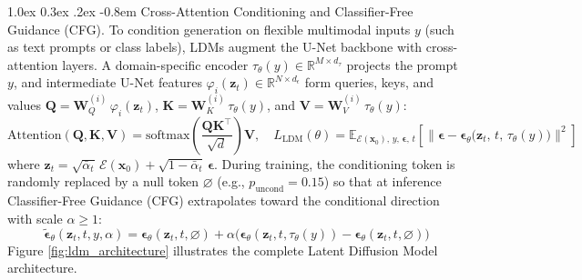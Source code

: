 \documentclass[10pt,a4paper]{article}
\makeatletter
\renewcommand\paragraph{\@startsection{paragraph}{4}{\z@}%
                                    {1.0ex \@plus 0.3ex \@minus .2ex}%
                                    {-0.8em}%
                                    {\normalfont\normalsize\bfseries}}
\makeatother
\begin{document}
\paragraph{Cross-Attention Conditioning and Classifier-Free Guidance (CFG).}
To condition generation on flexible multimodal inputs $y$ (such as text prompts or class labels), LDMs augment the U-Net backbone with cross-attention layers. A domain-specific encoder $\tau_\theta(y) \in \mathbb{R}^{M \times d_\tau}$ projects the prompt $y$, and intermediate U-Net features $\varphi_i(\mathbf{z}_t) \in \mathbb{R}^{N \times d_\epsilon}$ form queries, keys, and values $\mathbf{Q} = \mathbf{W}_Q^{(i)}\,\varphi_i(\mathbf{z}_t)$, $\mathbf{K} = \mathbf{W}_K^{(i)}\,\tau_\theta(y)$, and $\mathbf{V} = \mathbf{W}_V^{(i)}\,\tau_\theta(y)$:
\begin{equation}
    \text{Attention}(\mathbf{Q}, \mathbf{K}, \mathbf{V}) = \text{softmax}\!\left(\frac{\mathbf{Q}\mathbf{K}^\top}{\sqrt{d}}\right)\mathbf{V}, \quad L_{\text{LDM}}(\theta) = \mathbb{E}_{\mathcal{E}(\mathbf{x}_0), \, y, \, \bm{\epsilon}, \, t}\left[\big\|\bm{\epsilon} - \bm{\epsilon}_\theta\big(\mathbf{z}_t, \, t, \, \tau_\theta(y)\big)\big\|^2\right]
    \label{eq:l_ldm}
\end{equation}
where $\mathbf{z}_t = \sqrt{\bar{\alpha}_t}\,\mathcal{E}(\mathbf{x}_0) + \sqrt{1 - \bar{\alpha}_t}\,\bm{\epsilon}$. During training, the conditioning token is randomly replaced by a null token $\varnothing$ (e.g., $p_{\text{uncond}} = 0.15$) so that at inference Classifier-Free Guidance (CFG) extrapolates toward the conditional direction with scale $\alpha \ge 1$:
\begin{equation}
    \tilde{\bm{\epsilon}}_\theta(\mathbf{z}_t, t, y, \alpha) = \bm{\epsilon}_\theta(\mathbf{z}_t, t, \varnothing) + \alpha\big(\bm{\epsilon}_\theta(\mathbf{z}_t, t, \tau_\theta(y)) - \bm{\epsilon}_\theta(\mathbf{z}_t, t, \varnothing)\big)
    \label{eq:cfg_guidance}
\end{equation}
Figure \ref{fig:ldm_architecture} illustrates the complete Latent Diffusion Model architecture.
\end{document}
